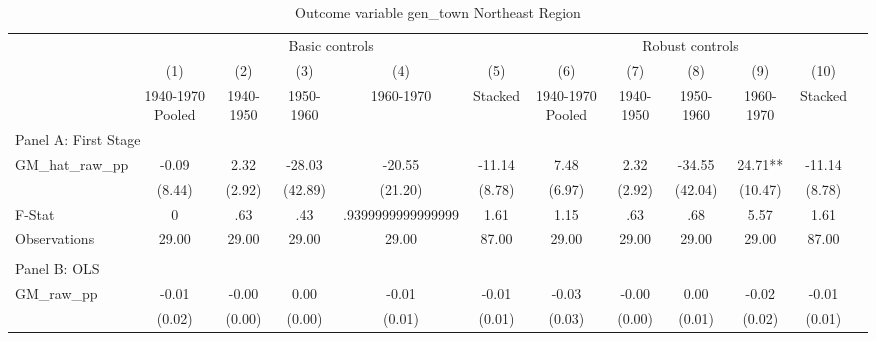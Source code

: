  \begin{table}[htbp]\centering {} \begin{threeparttable} \caption{Outcome variable gen\_town Northeast Region} \begin{tabular}{l*{11}{c}} \toprule
          &\multicolumn{5}{c}{Basic controls}                                   &\multicolumn{5}{c}{Robust controls}                                  \\\cmidrule(lr){2-6}\cmidrule(lr){7-11}
          &\multicolumn{1}{c}{(1)}&\multicolumn{1}{c}{(2)}&\multicolumn{1}{c}{(3)}&\multicolumn{1}{c}{(4)}&\multicolumn{1}{c}{(5)}&\multicolumn{1}{c}{(6)}&\multicolumn{1}{c}{(7)}&\multicolumn{1}{c}{(8)}&\multicolumn{1}{c}{(9)}&\multicolumn{1}{c}{(10)}\\
          &\multicolumn{1}{c}{1940-1970 Pooled}&\multicolumn{1}{c}{1940-1950}&\multicolumn{1}{c}{1950-1960}&\multicolumn{1}{c}{1960-1970}&\multicolumn{1}{c}{Stacked}&\multicolumn{1}{c}{1940-1970 Pooled}&\multicolumn{1}{c}{1940-1950}&\multicolumn{1}{c}{1950-1960}&\multicolumn{1}{c}{1960-1970}&\multicolumn{1}{c}{Stacked}\\
\cmidrule(lr){1-11}
\multicolumn{10}{l}{Panel A: First Stage}\\
\cmidrule(lr){1-11}
GM\_hat\_raw\_pp&     -0.09   &      2.32   &    -28.03   &    -20.55   &    -11.14   &      7.48   &      2.32   &    -34.55   &     24.71** &    -11.14   \\
          &    (8.44)   &    (2.92)   &   (42.89)   &   (21.20)   &    (8.78)   &    (6.97)   &    (2.92)   &   (42.04)   &   (10.47)   &    (8.78)   \\
\midrule
F-Stat    &         0   &       .63   &       .43   &.9399999999999999   &      1.61   &      1.15   &       .63   &       .68   &      5.57   &      1.61   \\
Observations&     29.00   &     29.00   &     29.00   &     29.00   &     87.00   &     29.00   &     29.00   &     29.00   &     29.00   &     87.00   \\
\cmidrule[\heavyrulewidth](lr){1-11} \\ \cmidrule[\heavyrulewidth](lr){1-11}
\multicolumn{10}{l}{Panel B: OLS}\\
\cmidrule(lr){1-11}
GM\_raw\_pp &     -0.01   &     -0.00   &      0.00   &     -0.01   &     -0.01   &     -0.03   &     -0.00   &      0.00   &     -0.02   &     -0.01   \\
          &    (0.02)   &    (0.00)   &    (0.00)   &    (0.01)   &    (0.01)   &    (0.03)   &    (0.00)   &    (0.01)   &    (0.02)   &    (0.01)   \\

\end{tabular}
\end{threeparttable}
\end{table}
